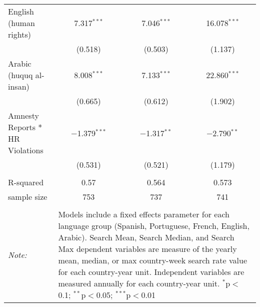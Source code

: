 \begin{table}[!htbp]
\begin{tabular}{@{\extracolsep{5pt}}lccc}
  English (human rights) & 7.317$^{***}$ & 7.046$^{***}$ & 16.078$^{***}$ \\ 
  & (0.518) & (0.503) & (1.137) \\ 
  Arabic (huquq al-insan) & 8.008$^{***}$ & 7.133$^{***}$ & 22.860$^{***}$ \\ 
  & (0.665) & (0.612) & (1.902) \\ 
  Amnesty Reports * HR Violations & $-$1.379$^{***}$ & $-$1.317$^{**}$ & $-$2.790$^{**}$ \\ 
  & (0.531) & (0.521) & (1.179) \\ 
 \hline \\[-1.8ex] 
R-squared  & 0.57 & 0.564 & 0.573 \\ 
sample size  & 753 & 737 & 741 \\ 
\hline 
\hline \\[-1.8ex] 
\textit{Note:}  & \multicolumn{3}{l}{\parbox[t]{8cm}{Models include a fixed effects parameter for each language group (Spanish, Portuguese, French, English, Arabic). Search Mean, Search Median, and Search Max dependent variables are measure of the yearly mean, median, or max country-week search rate value for each country-year unit. Independent variables are measured annually for each country-year unit. $^{*}$p$<$0.1; $^{**}$p$<$0.05; $^{***}$p$<$0.01}} \\ 
\end{tabular} 
\end{table} 
